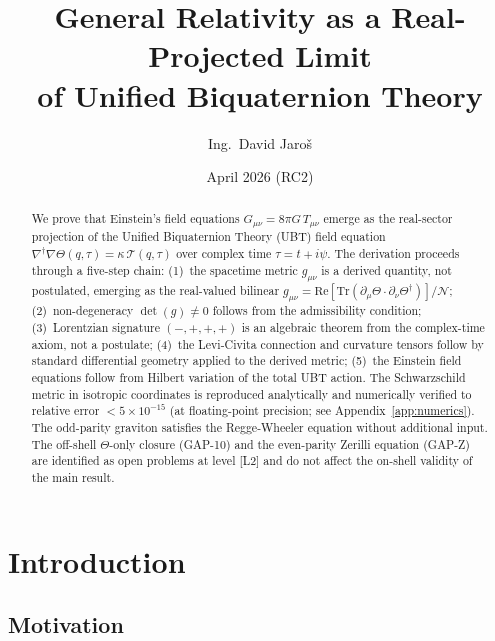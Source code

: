 \documentclass[12pt,a4paper]{article}
\title{\textbf{General Relativity as a Real-Projected Limit\\
       of Unified Biquaternion Theory}}
\author{Ing.\ David Jaroš}
\date{April 2026 (RC2)}
\theoremstyle{definition}
\theoremstyle{remark}
\newcommand{\Tr}{\mathrm{Tr}}
\newcommand{\re}{\mathrm{Re}}
\newcommand{\calN}{\mathcal{N}}
\begin{document}
\maketitle

\begin{abstract}
We prove that Einstein's field equations $G_{\mu\nu} = 8\pi G\,T_{\mu\nu}$
emerge as the real-sector projection of the Unified Biquaternion Theory (UBT)
field equation
$\nabla^\dagger\nabla\Theta(q,\tau) = \kappa\,\mathcal{T}(q,\tau)$
over complex time $\tau = t + i\psi$.
The derivation proceeds through a five-step chain:
(1)~the spacetime metric $g_{\mu\nu}$ is a derived quantity, not postulated,
emerging as the real-valued bilinear
$g_{\mu\nu} = \re[\Tr(\partial_\mu\Theta \cdot \partial_\nu\Theta^\dagger)]/\calN$;
(2)~non-degeneracy $\det(g) \neq 0$ follows from the admissibility condition;
(3)~Lorentzian signature $(-,+,+,+)$ is an algebraic theorem from the
complex-time axiom, not a postulate;
(4)~the Levi-Civita connection and curvature tensors follow by standard
differential geometry applied to the derived metric;
(5)~the Einstein field equations follow from Hilbert variation of the total
UBT action.
The Schwarzschild metric in isotropic coordinates is reproduced analytically
and numerically verified to relative error $< 5\times 10^{-15}$
(at floating-point precision; see Appendix~\ref{app:numerics}).
The odd-parity graviton satisfies the Regge-Wheeler equation without
additional input.
The off-shell $\Theta$-only closure (GAP-10) and the even-parity Zerilli
equation (GAP-Z) are identified as open problems at level [L2] and do not
affect the on-shell validity of the main result.
\end{abstract}

\tableofcontents
\bigskip\bigskip

\section{Introduction}
\label{sec:intro}

\subsection{Motivation}
\end{document}
